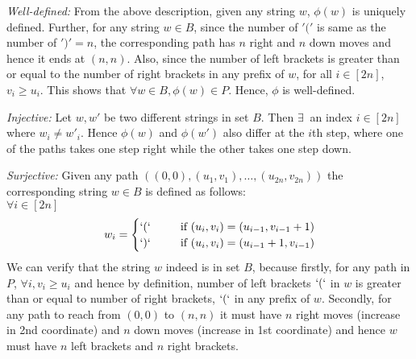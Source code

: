 \begin{description}
\item \textit{Well-defined:} From the above description, given any string $w$, $\phi(w)$ is uniquely defined. Further, for any string $w\in B$, since the number of $'('$ is same as  the number of $')' = n$, the corresponding path has $n$ right and $n$ down moves and hence it ends at $(n,n)$. Also, since the number of left brackets is greater than or equal to the number of right brackets in any prefix of $w$, for all $i\in[2n]$, $v_i\ge u_i$. This shows that $\forall w\in B, \phi(w)\in P$. Hence,  $\phi$ is well-defined.
\item \textit{Injective:} Let $w, w'$ be two different strings in set $B$. Then $\exists~$ an index $i\in[2n]$ where $w_i\ne w'_i$. Hence $\phi(w)$ and $\phi(w')$ also differ at the $i$th step, where one of the paths takes one step right while the other takes one step down. 
\item \textit{Surjective:} 
Given any path $((0,0), (u_1, v_1), \ldots, (u_{2n}, v_{2n}))$ the corresponding string $w\in B$ is defined as follows:\\
$\forall i\in[2n]$
\[
w_i = 
\begin{cases}
`(`& ~~~~~\text{if } (u_i, v_i) = (u_{i-1}, v_{i-1}+1)\\
`)`& ~~~~~\text{if } (u_i,v_i) = (u_{i-1}+1, v_{i-1})
\end{cases}
\]
We can verify that the string $w$ indeed is in set $B$, because firstly, for any path in $P$, $\forall i, v_i\ge u_i$ and hence by definition, number of left brackets $`(`$ in $w$ is greater than or equal to number of right brackets, $`(`$ in any prefix of $w$. Secondly, for any path to reach from $(0,0)$ to $(n,n)$ it must have $n$ right moves (increase in 2nd coordinate) and $n$ down moves (increase in 1st coordinate) and hence $w$ must have $n$ left brackets and $n$ right brackets.
\end{description}



